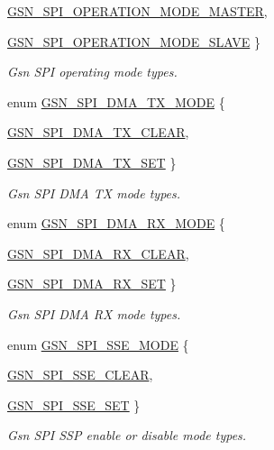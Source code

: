 \begin{DoxyCompactItemize}
\hyperlink{a00655_gga4b04f6b757fd4a767ea05de3de79ad15a41b20334a403fa4cba3f0516de08f358}{GSN\_\-SPI\_\-OPERATION\_\-MODE\_\-MASTER}, 
\par
\hyperlink{a00655_gga4b04f6b757fd4a767ea05de3de79ad15a3d789e465d2d8f6bfbe8664060babd5c}{GSN\_\-SPI\_\-OPERATION\_\-MODE\_\-SLAVE}
 \}
\begin{DoxyCompactList}\small\item\em Gsn SPI operating mode types. \end{DoxyCompactList}\item 
enum \hyperlink{a00655_gaf480fa60c7e6a9f132d47f0630a61b1a}{GSN\_\-SPI\_\-DMA\_\-TX\_\-MODE} \{ \par
\hyperlink{a00655_ggaf480fa60c7e6a9f132d47f0630a61b1aa1919ee7b81554032a841319c68fc9f22}{GSN\_\-SPI\_\-DMA\_\-TX\_\-CLEAR}, 
\par
\hyperlink{a00655_ggaf480fa60c7e6a9f132d47f0630a61b1aa7fad9b3d0348202826cd2d4b441ccc61}{GSN\_\-SPI\_\-DMA\_\-TX\_\-SET}
 \}
\begin{DoxyCompactList}\small\item\em Gsn SPI DMA TX mode types. \end{DoxyCompactList}\item 
enum \hyperlink{a00655_ga21afd388959dd6b6c022109aa9a42586}{GSN\_\-SPI\_\-DMA\_\-RX\_\-MODE} \{ \par
\hyperlink{a00655_gga21afd388959dd6b6c022109aa9a42586ad73b5edf1fdca2408d5e01fd1653919e}{GSN\_\-SPI\_\-DMA\_\-RX\_\-CLEAR}, 
\par
\hyperlink{a00655_gga21afd388959dd6b6c022109aa9a42586a805ddceba5549edcca5ea80a4ad36319}{GSN\_\-SPI\_\-DMA\_\-RX\_\-SET}
 \}
\begin{DoxyCompactList}\small\item\em Gsn SPI DMA RX mode types. \end{DoxyCompactList}\item 
enum \hyperlink{a00655_ga03895c293b4a0520478212a5a031020d}{GSN\_\-SPI\_\-SSE\_\-MODE} \{ \par
\hyperlink{a00655_gga03895c293b4a0520478212a5a031020da7589e64256fe936761aa1d21a631f5cb}{GSN\_\-SPI\_\-SSE\_\-CLEAR}, 
\par
\hyperlink{a00655_gga03895c293b4a0520478212a5a031020da5985d59b31c7810deee4cb66a196ca20}{GSN\_\-SPI\_\-SSE\_\-SET}
 \}
\begin{DoxyCompactList}\small\item\em Gsn SPI SSP enable or disable mode types. \end{DoxyCompactList}\item 

\end{DoxyCompactItemize}
